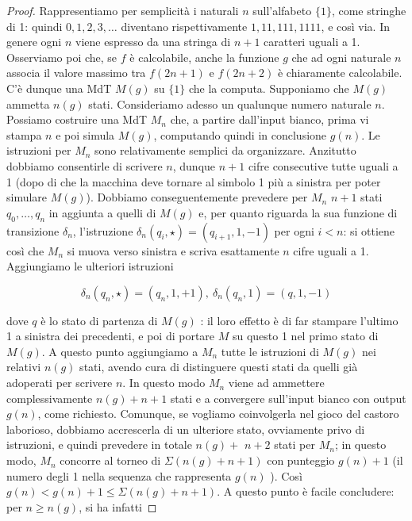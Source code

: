 \begin{proof}
    Rappresentiamo per semplicità i naturali $n$
    sull'alfabeto $\{1\}$, come stringhe di 1: quindi $0,1,2,3, \ldots$ diventano
    rispettivamente $1,11,111,1111$, e così via. In genere ogni $n$ viene espresso da una
    stringa di $n+1$ caratteri uguali a 1. Osserviamo poi che, se $f$ è calcolabile,
    anche la funzione $g$ che ad ogni naturale $n$ associa il valore massimo tra $f(2
        n+1)$ e $f(2 n+2)$ è chiaramente calcolabile. C'è dunque una MdT $M(g)$ su $\{1\}$
    che la computa. Supponiamo che $M(g)$ ammetta $n(g)$ stati. Consideriamo adesso un
    qualunque numero naturale $n$. Possiamo costruire una MdT $M_n$ che, a partire
    dall'input bianco, prima vi stampa $n$ e poi simula $M(g)$, computando quindi in
    conclusione $g(n)$. Le istruzioni per $M_n$ sono relativamente semplici da
    organizzare. Anzitutto dobbiamo consentirle di scrivere $n$, dunque $n+1$ cifre
    consecutive tutte uguali a 1 (dopo di che la macchina deve tornare al simbolo 1 più a
    sinistra per poter simulare $M(g)$). Dobbiamo conseguentemente prevedere per $M_n$
    $n+1$ stati $q_0, \ldots, q_n$ in aggiunta a quelli di $M(g)$ e, per quanto riguarda
    la sua funzione di transizione $\delta_n$, l'istruzione $\delta_n\left(q_i,
        \star\right)=\left(q_{i+1}, 1,-1\right)$ per ogni $i<n$: si ottiene così che $M_n$
    si muova verso sinistra e scriva esattamente $n$ cifre uguali a 1. Aggiungiamo le
    ulteriori istruzioni

    \[
        \delta_n\left(q_n, \star\right)=\left(q_n, 1,+1\right), \ \delta_n\left(q_n, 1\right)=(q, 1,-1)
    \]

    dove $q$ è lo stato di partenza di $M(g)$ : il loro effetto è di far stampare
    l'ultimo 1 a sinistra dei precedenti, e poi di portare $M$ su questo 1 nel primo
    stato di $M(g)$. A questo punto aggiungiamo a $M_n$ tutte le istruzioni di $M(g)$ nei
    relativi $n(g)$ stati, avendo cura di distinguere questi stati da quelli già
    adoperati per scrivere $n$. In questo modo $M_n$ viene ad ammettere complessivamente
    $n(g)+n+1$ stati e a convergere sull'input bianco con output $g(n)$, come richiesto.
    Comunque, se vogliamo coinvolgerla nel gioco del castoro laborioso, dobbiamo
    accrescerla di un ulteriore stato, ovviamente privo di istruzioni, e quindi prevedere
    in totale $n(g)+$ $n+2$ stati per $M_n$; in questo modo, $M_n$ concorre al torneo di
    $\Sigma(n(g)+n+1)$ con punteggio $g(n)+1$ (il numero degli 1 nella sequenza che
    rappresenta $g(n)$ ). Così $g(n)<g(n)+1 \leq \Sigma(n(g)+n+1)$. A questo punto è
    facile concludere: per $n \geq n(g)$, si ha infatti


\end{proof}
